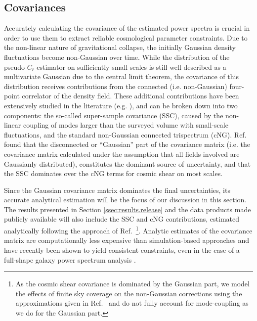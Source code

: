 \documentclass[a4paper,11pt]{article}
\begin{document}
    \subsection{Covariances}\label{ssec:pcl.covar}
      Accurately calculating the covariance of the estimated power spectra is crucial in order to use them to extract reliable cosmological parameter constraints. Due to the non-linear nature of gravitational collapse, the initially Gaussian density fluctuations become non-Gaussian over time. While the distribution of the pseudo-$C_\ell$ estimator on sufficiently small scales is still well described as a multivariate Gaussian \cite{0801.0554,1707.04488} due to the central limit theorem, the covariance of this distribution receives contributions from the connected (i.e. non-Gaussian) four-point correlator of the density field. These additional contributions have been extensively studied in the literature (e.g. \cite{astro-ph/0012087,0810.4170,0906.2237,1302.6994}), and can be broken down into two components: the so-called super-sample covariance (SSC), caused by the non-linear coupling of modes larger than the surveyed volume with small-scale fluctuations, and the standard non-Gaussian connected trispectrum (cNG). Ref.~\cite{1807.04266} found that the disconnected or ``Gaussian'' part of the covariance matrix (i.e. the covariance matrix calculated under the assumption that all fields involved are Gaussianly distributed), constitutes the dominant source of uncertainty, and that the SSC dominates over the cNG terms for cosmic shear on most scales.
      
      Since the Gaussian covariance matrix dominates the final uncertainties, its accurate analytical estimation will be the focus of our discussion in this section. The results presented in Section \ref{ssec:results.release} and the data products made publicly available will also include the SSC and cNG contributions, estimated analytically following the approach of Ref.~\cite{1601.05779}\footnote{As the cosmic shear covariance is dominated by the Gaussian part, we model the effects of finite sky coverage on the non-Gaussian corrections using the approximations given in Ref.~\cite{1601.05779} and do not fully account for mode-coupling as we do for the Gaussian part.}. Analytic estimates of the covariance matrix are computationally less expensive than simulation-based approaches and have recently been shown to yield consistent constraints, even in the case of a full-shape galaxy power spectrum analysis \cite{2009.00622}.
\end{document}
